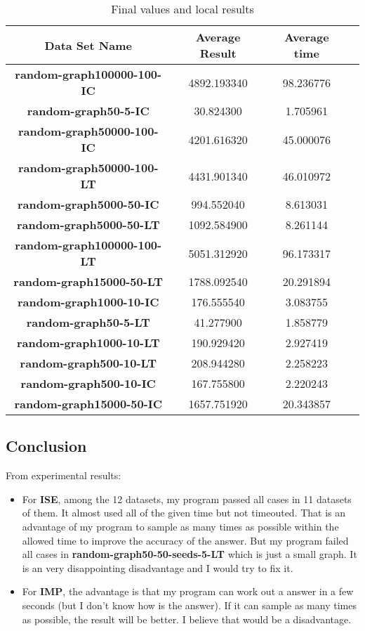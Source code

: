 \documentclass[lang=en,12pt]{elegantpaper}
\begin{document}
\begin{table}[htbp]
  \small
  \centering
  \caption{Final values and local results \label{tab:reg}}
    \begin{tabular}{cccc}
    \toprule
               Data Set Name            & Average Result & Average time           \\
    \midrule
    \textbf{random-graph100000-100-IC}	& 4892.193340	& 98.236776 \\
    \textbf{random-graph50-5-IC}		    & 30.824300	  & 1.705961 \\
    \textbf{random-graph50000-100-IC}		& 4201.616320	& 45.000076 \\
    \textbf{random-graph50000-100-LT}		& 4431.901340	& 46.010972 \\
    \textbf{random-graph5000-50-IC}		  & 994.552040	& 8.613031 \\
    \textbf{random-graph5000-50-LT}		  & 1092.584900	& 8.261144 \\
    \textbf{random-graph100000-100-LT}	& 5051.312920	& 96.173317 \\
    \textbf{random-graph15000-50-LT}		& 1788.092540	& 20.291894 \\
    \textbf{random-graph1000-10-IC}		  & 176.555540	& 3.083755 \\
    \textbf{random-graph50-5-LT}		    & 41.277900	  & 1.858779 \\
    \textbf{random-graph1000-10-LT}		  & 190.929420	& 2.927419 \\
    \textbf{random-graph500-10-LT}		  & 208.944280	& 2.258223 \\
    \textbf{random-graph500-10-IC}		  & 167.755800	& 2.220243 \\
    \textbf{random-graph15000-50-IC}		& 1657.751920	& 20.343857 \\
    \bottomrule
    \end{tabular}%
\end{table}%

\subsection{Conclusion}
From experimental results:
\begin{itemize}
  \item For \textbf{ISE}, among the 12 datasets, my program passed all cases in 11 datasets of them.
  It almost used all of the given time but not timeouted. That is an advantage of my program to sample as many times as possible within the allowed time to improve the accuracy of the answer.
  But my program failed all cases in \textbf{random-graph50-50-seeds-5-LT} which is just a small graph. It is an very disappointing disadvantage and I would try to fix it.
  \item For \textbf{IMP}, the advantage is that my program can work out a answer in a few seconds (but I don't know how is the answer).
  If it can sample as many times as possible, the result will be better. I believe that would be a disadvantage.
\end{itemize}

\nocite{*}

\end{document}
